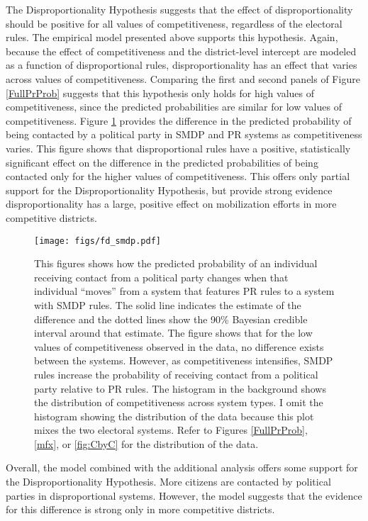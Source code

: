 \documentclass[12pt]{article}
\begin{document}
The Disproportionality Hypothesis suggests that the effect of disproportionality should be positive for all values of competitiveness, regardless of the electoral rules. The empirical model presented above supports this hypothesis. Again, because the effect of competitiveness and the district-level intercept are modeled as a function of disproportional rules, disproportionality has an effect that varies across values of competitiveness. Comparing the first and second panels of Figure \ref{FullPrProb} suggests that this hypothesis only holds for high values of competitiveness, since the predicted probabilities are similar for low values of competitiveness. Figure \ref{FD} provides the difference in the predicted probability of being contacted by a political party in SMDP and PR systems as competitiveness varies. This figure shows that disproportional rules have a positive, statistically significant effect on the difference in the predicted probabilities of being contacted only for the higher values of competitiveness. This offers only partial support for the Disproportionality Hypothesis, but provide strong evidence disproportionality has a large, positive effect on mobilization efforts in more competitive districts.

\begin{figure}[h]
\centering
\texttt{[image: figs/fd\_smdp.pdf]}
\caption{This figures shows how the predicted probability of an individual receiving contact from a political party changes when that individual ``moves'' from a system that features PR rules to a system with SMDP rules. The solid line indicates the estimate of the difference and the dotted lines show the 90\% Bayesian credible interval around that estimate. The figure shows that for the low values of competitiveness observed in the data, no difference exists between the systems. However, as competitiveness intensifies, SMDP rules increase the probability of receiving contact from a political party relative to PR rules. The histogram in the background shows the distribution of competitiveness across system types. I omit the histogram showing the distribution of the data because this plot mixes the two electoral systems. Refer to Figures \ref{FullPrProb}, \ref{mfx}, or \ref{fig:CbyC} for the distribution of the data.}\label{FD}
\end{figure}

Overall, the model combined with the additional analysis offers some support for the Disproportionality Hypothesis. More citizens are contacted by political parties in disproportional systems. However, the model suggests that the evidence for this difference is strong only in more competitive districts.
\end{document}
